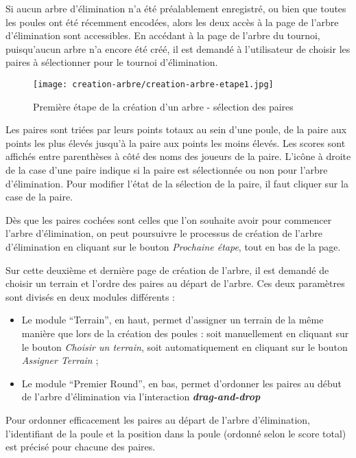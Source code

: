 Si aucun arbre d'élimination n'a été préalablement enregistré, ou bien que toutes les poules ont été récemment encodées, alors les deux accès à la page de l'arbre d'élimination sont accessibles. En accédant à la page de l'arbre du tournoi, puisqu'aucun arbre n'a encore été créé, il est demandé à l'utilisateur de choisir les paires à sélectionner pour le tournoi d'élimination.

\begin{figure}[H]
\centering
\texttt{[image: creation-arbre/creation-arbre-etape1.jpg]}
\caption{Première étape de la création d'un arbre - sélection des paires}
\end{figure}

Les paires sont triées par leurs points totaux au sein d'une poule, de la paire aux points les plus élevés jusqu'à la paire aux points les moins élevés. Les scores sont affichés entre parenthèses à côté des noms des joueurs de la paire. L'icône à droite de la case d'une paire indique si la paire est sélectionnée ou non pour l'arbre d'élimination. Pour modifier l'état de la sélection de la paire, il faut cliquer sur la case de la paire.\newline

Dès que les paires cochées sont celles que l'on souhaite avoir pour commencer l'arbre d'élimination, on peut poursuivre le processus de création de l'arbre d'élimination en cliquant sur le bouton \textit{Prochaine étape}, tout en bas de la page.\newline

Sur cette deuxième et dernière page de création de l'arbre, il est demandé de choisir un terrain et l'ordre des paires au départ de l'arbre. Ces deux paramètres sont divisés en deux modules différents :

\begin{itemize}
\item Le module \enquote{Terrain}, en haut, permet d'assigner un terrain de la même manière que lors de la création des poules : soit manuellement en cliquant sur le bouton \textit{Choisir un terrain}, soit automatiquement en cliquant sur le bouton \textit{Assigner Terrain} ;
\item Le module \enquote{Premier Round}, en bas, permet d'ordonner les paires au début de l'arbre d'élimination via l'interaction \textbf{\textit{drag-and-drop}}
\end{itemize}
\bigskip

Pour ordonner efficacement les paires au départ de l'arbre d'élimination, l'identifiant de la poule et la position dans la poule (ordonné selon le score total) est précisé pour chacune des paires.

